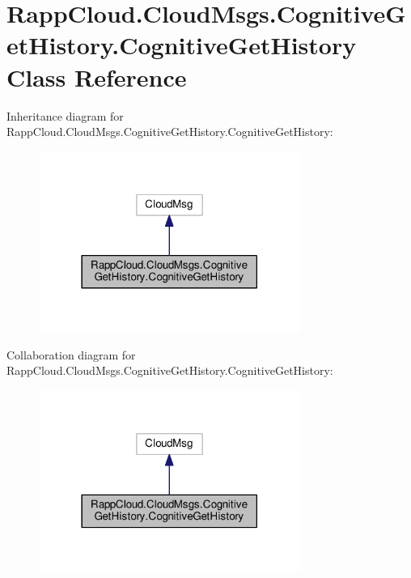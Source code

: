 \hypertarget{classRappCloud_1_1CloudMsgs_1_1CognitiveGetHistory_1_1CognitiveGetHistory}{\section{Rapp\-Cloud.\-Cloud\-Msgs.\-Cognitive\-Get\-History.\-Cognitive\-Get\-History Class Reference}
\label{classRappCloud_1_1CloudMsgs_1_1CognitiveGetHistory_1_1CognitiveGetHistory}
}


Inheritance diagram for Rapp\-Cloud.\-Cloud\-Msgs.\-Cognitive\-Get\-History.\-Cognitive\-Get\-History\-:
\nopagebreak
\begin{figure}[H]
\begin{center}
\leavevmode
\includegraphics[width=242pt]{classRappCloud_1_1CloudMsgs_1_1CognitiveGetHistory_1_1CognitiveGetHistory__inherit__graph}
\end{center}
\end{figure}


Collaboration diagram for Rapp\-Cloud.\-Cloud\-Msgs.\-Cognitive\-Get\-History.\-Cognitive\-Get\-History\-:
\nopagebreak
\begin{figure}[H]
\begin{center}
\leavevmode
\includegraphics[width=242pt]{classRappCloud_1_1CloudMsgs_1_1CognitiveGetHistory_1_1CognitiveGetHistory__coll__graph}
\end{center}
\end{figure}
